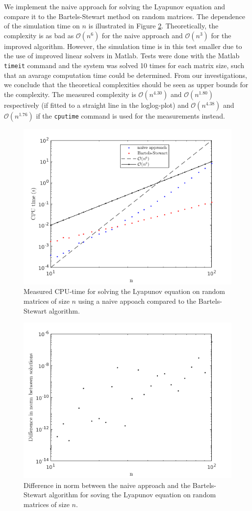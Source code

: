 We implement the naive approach for solving the Lyapunov equation and compare it to the Bartels-Stewart method on random matrices. The dependence of the simulation time on $n$ is illustrated in Figure \ref{task1}. Theoretically, the complexity is as bad as $\mathcal O(n^6)$ for the naive approach and $\mathcal O(n^3)$ for the improved algorithm. However, the simulation time is in this test smaller due to the use of improved linear solvers in Matlab. Tests were done with the Matlab \texttt{timeit} command and the system was solved 10 times for each matrix size, such that an avarage computation time could be determined. From our investigations, we conclude that the theoretical complexities should be seen as upper bounds for the complexity. The measured complexity is $\mathcal O(n^{4.30})$ and $\mathcal O(n^{1.80})$  respectively (if fitted to a straight line in the loglog-plot) and $\mathcal O(n^{4.38})$ and $\mathcal O(n^{1.76})$ if the \texttt{cputime} command is used for the measurements instead. 
\begin{figure}[h!]
\centering
\includegraphics[scale=0.5]{cpu.png}
\caption{Measured CPU-time for solving the Lyapunov equation on random matrices of size $n$ using a naive appoach compared to the Bartels-Stewart algorithm.}
\label{task1}
\end{figure}

\begin{figure}[h!]
\centering
\includegraphics[scale=0.5]{norm.png}
\caption{Difference in norm between the naive approach and the Bartels-Stewart algorithm for soving the Lyapunov equation on random matrices of size $n$.}
\label{task1}
\end{figure}
